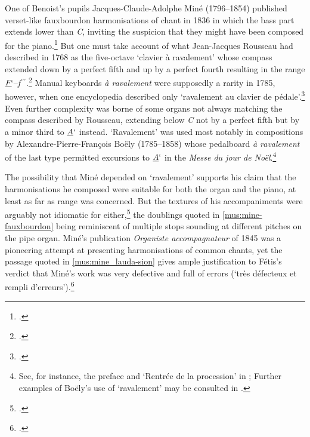 %
One of Benoist's pupils Jacques-Claude-Adolphe Miné (1796--1854) published verset-like fauxbourdon harmonisations of chant in 1836 in which the bass part extends lower than \emph{C}, inviting the suspicion that they might have been composed for the piano.\footcites[32, 64--6]{MineMethodeorgue1836}
But one must take account of what Jean-Jacques Rousseau had described in 1768 as the five-octave `clavier à ravalement' whose compass extended down by a perfect fifth and up by a perfect fourth resulting in the range $\emph{F}\kern -1pt`$--\emph{f}$^{\prime\prime\prime}$.\footcite[pp. 405, unpaginated `Planche 1', fig.~1]{RousseauDictionnairemusique1768}
Manual keyboards \emph{à ravalement} were supposedly a rarity in 1785, however, when one encyclopedia described only `ravalement au clavier de pédale'.\footcite[77--8]{Encyclopediemethodiqueou1785}
Even further complexity was borne of some organs not always matching the compass described by Rousseau, extending below \emph{C} not by a perfect fifth but by a minor third to $\emph{A}`$ instead.
`Ravalement' was used most notably in compositions by Alexandre-Pierre-François Boëly (1785--1858) whose pedalboard \emph{à ravalement} of the last type permitted excursions to $\emph{A}`$ in the \emph{Messe du jour de Noël}.\footnote{See, for instance, the preface and `Rentrée de la procession' in \cite{BoelyMessejourNoel}; Further examples of Boëly's use of `ravalement' may be consulted in \cite[9]{BoelyPieceschoisiespour}.}%

The possibility that Miné depended on `ravalement' supports his claim that the harmonisations he composed were suitable for both the organ and the piano, at least as far as range was concerned.
But the textures of his accompaniments were arguably not idiomatic for either,\footcite[33]{ChristensenStoriesTonalityAge2019} the doublings quoted in \cref{mus:mine-fauxbourdon} being reminiscent of multiple stops sounding at different pitches on the pipe organ.
%
Miné's publication \emph{Organiste accompagnateur} of 1845 was a pioneering attempt at presenting harmonisations of common chants, yet the passage quoted in \cref{mus:mine_lauda-sion} gives ample justification to Fétis's verdict that Miné's work was very defective and full of errors (`très défecteux et rempli d'erreurs').\footcites[7]{MineorganisteaccompagnateurRecueil1845}[148]{FetisBiographieuniversellemusiciens1867}

